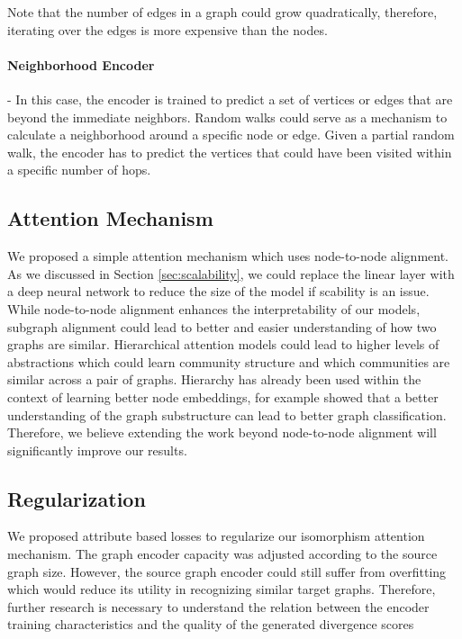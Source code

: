 \documentclass[sigconf]{acmart}
\begin{document}
Note that the number of edges in a graph could grow quadratically, therefore, iterating over the edges is more expensive than the nodes.

\paragraph{Neighborhood Encoder} -
In this case, the encoder is trained to predict a set of vertices or edges that are beyond the immediate neighbors.
Random walks could serve as a mechanism to calculate a neighborhood around a specific node or edge.
Given a partial random walk, the encoder has to predict the vertices that could have been visited within a specific number of hops.



\subsection{Attention Mechanism}
We proposed a simple attention mechanism which uses node-to-node alignment.
As we discussed in Section \ref{sec:scalability}, we could replace the linear layer with a deep neural network to reduce the size of the model if scability is an issue.
While node-to-node alignment enhances the interpretability of our models, subgraph alignment could lead to better and easier understanding of how two graphs are similar.
Hierarchical attention models \cite{yang2016hierarchical} could lead to higher levels of abstractions which could learn community structure and which communities are similar across a pair of graphs.
Hierarchy has already been used within the context of learning better node embeddings, for example \citep{ying2018hierarchical} showed that a better understanding of the graph substructure can lead to better graph classification.
Therefore, we believe extending the work beyond node-to-node alignment will significantly improve our results.


\subsection{Regularization}
We proposed attribute based losses to regularize our isomorphism attention mechanism.
The graph encoder capacity was adjusted according to the source graph size.
However, the source graph encoder could still suffer from overfitting which would reduce its utility in recognizing similar target graphs.
Therefore, further research is necessary to understand the relation between the encoder training characteristics and the quality of the generated divergence scores
\end{document}
